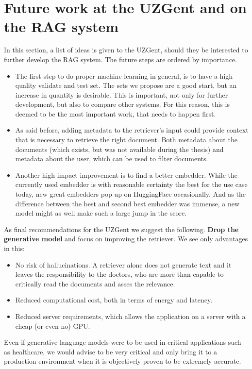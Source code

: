 \section{Future work at the UZGent and on the RAG system}
In this section, a list of ideas is given to the UZGent, should they be interested to further develop the RAG system. The future steps are ordered by importance.

\begin{itemize}
    \item The first step to do proper machine learning in general, is to have a high quality validate and test set. The sets we propose are a good start, but an increase in quantity is desirable. This is important, not only for further development, but also to compare other systems. For this reason, this is deemed to be the most important work, that needs to happen first. 
    \item As said before, adding metadata to the retriever's input could provide context that is necessary to retrieve the right document. Both metadata about the documents (which exists, but was not available during the thesis) and metadata about the user, which can be used to filter documents. 
    \item Another high impact improvement is to find a better embedder. While the currently used embedder is with reasonable certainty the best for the use case today, new great embedders pop up on HuggingFace occasionally. And as the difference between the best and second best embedder was immense, a new model might as well make such a large jump in the score.
\end{itemize}

As final recommendations for the UZGent we suggest the following. \textbf{Drop the generative model} and focus on improving the retriever. We see only advantages in this:
\begin{itemize}
    \item No risk of hallucinations. A retriever alone does not generate text and it leaves the responsibility to the doctors, who are more than capable to critically read the documents and asses the relevance.
    \item Reduced computational cost, both in terms of energy and latency.
    \item Reduced server requirements, which allows the application on a server with a cheap (or even no) GPU.
\end{itemize}
Even if generative language models were to be used in critical applications such as healthcare, we would advise to be very critical and only bring it to a production environment when it is objectively proven to be extremely accurate.

